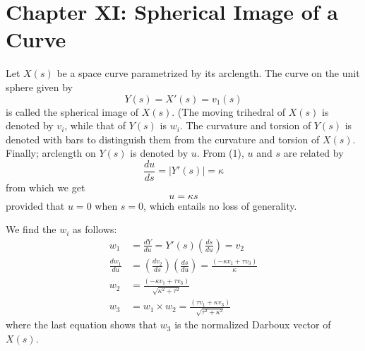 \documentclass{book}
\begin{document}
\chapter*{Chapter XI: Spherical Image of a Curve}

\setcounter{equation}{0}

Let $X(s)$ be a space curve parametrized by its arclength. The curve on the unit sphere given by
\begin{equation}
Y(s) = X'(s) = v_{1}(s)
\end{equation}
is called the spherical image of $X(s)$. (The moving trihedral of $X(s)$ is denoted by $v_{i}$, while that of $Y(s)$ is $w_{i}$. The curvature and torsion of $Y(s)$ is denoted with bars to distinguish them from the curvature and torsion of $X(s)$. Finally; arclength on $Y(s)$ is denoted by $u$. From (1), $u$ and $s$ are related by
\begin{equation}
\frac{du}{ds} = \vert Y'(s) \vert = \kappa
\end{equation}
from which we get
\begin{equation}
u = \kappa s
\end{equation}
provided that $u = 0$ when $s = 0$, which entails no loss of generality.

We find the $w_{i}$ as follows:
\begin{align}
    w_{1} & = \frac{dY}{du} = Y'(s)(\frac{ds}{du}) = v_{2} \\
\frac{dw_{1}}{du} & = \left( \frac{dv_{2}}{ds} \right) \left( \frac{ds}{du} \right) = \frac{(-\kappa v_{1} + \tau v_{3})}{\kappa} \\
    w_{2} & = \frac{(-\kappa v_{1} + \tau v_{3})}{ \sqrt{\kappa ^{2} + \tau ^{2}} } \\
    w_{3} & = w_{1} \times w_{2} = \frac{(\tau v_{1} + \kappa v_{3})}{ \sqrt{\tau ^{2} + \kappa ^{2}} }
\end{align}
where the last equation shows that $w_{3}$ is the normalized Darboux vector of $X(s)$.
\end{document}
